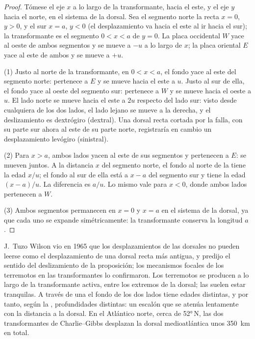 \begin{proof}
Tómese el eje $x$ a lo largo de la transformante, hacia el este, y el eje $y$ hacia el norte, en el sistema de la dorsal. Sea el segmento
norte la recta $x = 0$, $y > 0$, y el sur $x = a$, $y < 0$ (el desplazamiento va hacia el este al ir hacia el sur); la transformante es el
segmento $0 < x < a$ de $y = 0$. La placa occidental $W$ yace al oeste de ambos segmentos y se mueve a $-u$ a lo largo de $x$; la placa
oriental $E$ yace al este de ambos y se mueve a $+u$.

(1) Justo al norte de la transformante, en $0 < x < a$, el fondo yace al este del segmento norte: pertenece a $E$ y se mueve hacia el este a
$u$. Justo al sur de ella, el fondo yace al oeste del segmento sur: pertenece a $W$ y se mueve hacia el oeste a $u$. El lado norte se mueve
hacia el este a $2u$ respecto del lado sur: visto desde cualquiera de los dos lados, el lado lejano se mueve a la derecha, y el deslizamiento
es dextrógiro (dextral). Una dorsal recta cortada por la falla, con su parte sur ahora al este de su parte norte, registraría en cambio un
desplazamiento levógiro (sinistral).

(2) Para $x > a$, ambos lados yacen al este de sus segmentos y pertenecen a $E$: se mueven juntos. A la distancia $x$ del segmento norte, el
fondo al norte de la  tiene la edad $x/u$; el fondo al sur de ella está a $x - a$ del segmento sur y tiene la edad
$(x - a)/u$. La diferencia es $a/u$. Lo mismo vale para $x < 0$, donde ambos lados pertenecen a $W$.

(3) Ambos segmentos permanecen en $x = 0$ y $x = a$ en el sistema de la dorsal, ya que cada uno se expande simétricamente: la transformante
conserva la longitud $a$.
\end{proof}

J.\ Tuzo Wilson vio en 1965 que los desplazamientos de las dorsales no pueden leerse como el desplazamiento de una dorsal recta más antigua, y
predijo el sentido del deslizamiento de la proposición; los mecanismos focales de los terremotos en las transformantes lo confirmaron. Los
terremotos se producen a lo largo de la transformante activa, entre los extremos de la dorsal; las  suelen estar tranquilas.
A través de una  el fondo de los dos lados tiene edades distintas, y por tanto, según la , profundidades
distintas: un escalón que se atenúa lentamente con la distancia a la dorsal. En el Atlántico norte, cerca de \ang{52}\,N, las dos
transformantes de Charlie--Gibbs desplazan la dorsal medioatlántica unos \qty{350}{km} en total.

